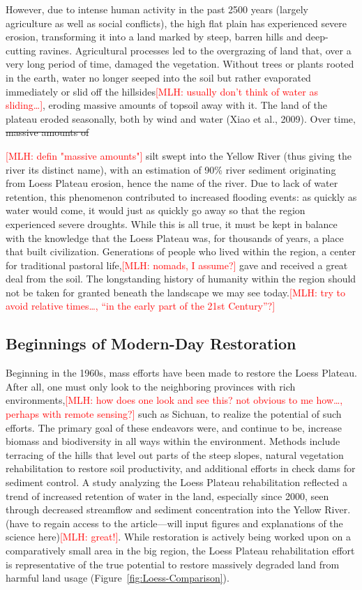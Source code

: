 \documentclass{book}\usepackage{knitr}
\newcommand{\red}[1]{\textcolor{red}{[MLH: #1]}}
\begin{document}
\begin{knitrout}
\begin{kframe}
However, due to intense human activity in the past 2500 years (largely agriculture as well as social conflicts), the high flat plain has experienced severe erosion, transforming it into a land marked by steep, barren hills and deep-cutting ravines. Agricultural processes led to the overgrazing of land that, over a very long period of time, damaged the vegetation. Without trees or plants rooted in the earth, water no longer seeped into the soil but rather evaporated immediately or slid off the hillsides\red{usually don't think of water as sliding\ldots}, eroding massive amounts of topsoil away with it. The land of the plateau eroded seasonally, both by wind and water (Xiao et al., 2009). Over time, \st{massive amounts of}{\red{defin "massive amounts"} silt swept into the Yellow River (thus giving the river its distinct name), with an estimation of 90\% river sediment originating from Loess Plateau erosion, hence the name of the river. Due to lack of water retention, this phenomenon contributed to increased flooding events: as quickly as water would come, it would just as quickly go away so that the region experienced severe droughts. While this is all true, it must be kept in balance with the knowledge that the Loess Plateau was, for thousands of years, a place that built civilization. Generations of people who lived within the region, a center for traditional pastoral life,\red{nomads, I assume?} gave and received a great deal from the soil. The longstanding history of humanity within the region should not be taken for granted beneath the landscape we may see today.\red{try to avoid relative times\ldots, ``in the early part of the 21st Century''?}

\subsection{Beginnings of Modern-Day Restoration}

Beginning in the 1960s, mass efforts have been made to restore the Loess Plateau. After all, one must only look to the neighboring provinces with rich environments,\red{how does one look and see this? not obvious to me how\ldots, perhaps with remote sensing?} such as Sichuan, to realize the potential of such efforts. The primary goal of these endeavors were, and continue to be, increase biomass and biodiversity in all ways within the environment. Methods include terracing of the hills that level out parts of the steep slopes, natural vegetation rehabilitation to restore soil productivity, and additional efforts in check dams for sediment control. A study analyzing the Loess Plateau rehabilitation reflected a trend of increased retention of water in the land, especially since 2000, seen through decreased streamflow and sediment concentration into the Yellow River. (have to regain access to the article—will input figures and explanations of the science here)\red{great!}. While restoration is actively being worked upon on a comparatively small area in the big region, the Loess Plateau rehabilitation effort is representative of the true potential to restore massively degraded land from harmful land usage (Figure~\ref{fig:Loess-Comparison}).

}
\end{kframe}
\end{knitrout}
\end{document}
